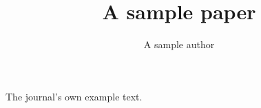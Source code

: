 \documentclass{journal}
\title{A sample paper}
\author{A sample author}
\begin{document}
\maketitle
The journal's own example text.
\end{document}

